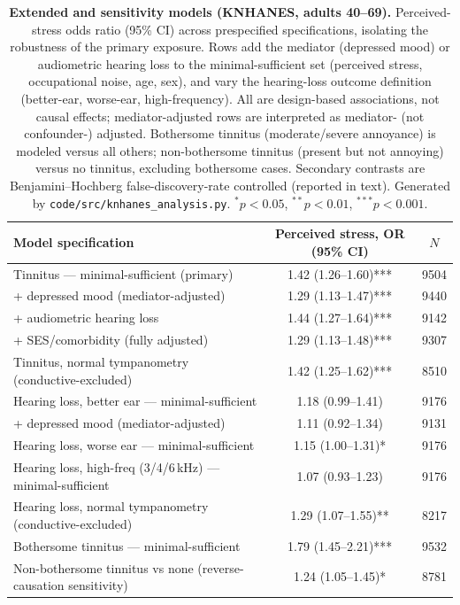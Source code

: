 \begin{table}[htbp]
\centering
\caption{\textbf{Extended and sensitivity models (KNHANES, adults 40--69).} Perceived-stress odds ratio (95\% CI) across prespecified specifications, isolating the robustness of the primary exposure. Rows add the mediator (depressed mood) or audiometric hearing loss to the minimal-sufficient set (perceived stress, occupational noise, age, sex), and vary the hearing-loss outcome definition (better-ear, worse-ear, high-frequency). All are design-based associations, not causal effects; mediator-adjusted rows are interpreted as mediator- (not confounder-) adjusted. Bothersome tinnitus (moderate/severe annoyance) is modeled versus all others; non-bothersome tinnitus (present but not annoying) versus no tinnitus, excluding bothersome cases. Secondary contrasts are Benjamini--Hochberg false-discovery-rate controlled (reported in text). Generated by \texttt{code/src/knhanes\_analysis.py}. $^{*}p<0.05$, $^{**}p<0.01$, $^{***}p<0.001$.}
\label{tab:results_knhanes_extended}
\small
\begin{tabular}{lcc}
\toprule
Model specification & Perceived stress, OR (95\% CI) & $N$ \\
\midrule
Tinnitus --- minimal-sufficient (primary) & 1.42 (1.26--1.60)*** & 9504 \\
\quad + depressed mood (mediator-adjusted) & 1.29 (1.13--1.47)*** & 9440 \\
\quad + audiometric hearing loss & 1.44 (1.27--1.64)*** & 9142 \\
\quad + SES/comorbidity (fully adjusted) & 1.29 (1.13--1.48)*** & 9307 \\
Tinnitus, normal tympanometry (conductive-excluded) & 1.42 (1.25--1.62)*** & 8510 \\
Hearing loss, better ear --- minimal-sufficient & 1.18 (0.99--1.41) & 9176 \\
\quad + depressed mood (mediator-adjusted) & 1.11 (0.92--1.34) & 9131 \\
Hearing loss, worse ear --- minimal-sufficient & 1.15 (1.00--1.31)* & 9176 \\
Hearing loss, high-freq (3/4/6\,kHz) --- minimal-sufficient & 1.07 (0.93--1.23) & 9176 \\
Hearing loss, normal tympanometry (conductive-excluded) & 1.29 (1.07--1.55)** & 8217 \\
Bothersome tinnitus --- minimal-sufficient & 1.79 (1.45--2.21)*** & 9532 \\
Non-bothersome tinnitus vs none (reverse-causation sensitivity) & 1.24 (1.05--1.45)* & 8781 \\
\bottomrule
\end{tabular}
\end{table}
